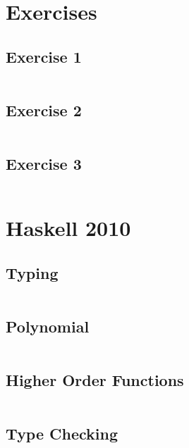 \documentclass[a4paper,9pt]{article}
\newcommand{\hsfile}[1]{\inputminted[breaklines]{haskell}{../haskell/#1.hs}}
\begin{document}
\section{Exercises}
\subsection{Exercise 1}
\hsfile{ex01/ex01}
\subsection{Exercise 2}
\hsfile{ex02/ex02}
\subsection{Exercise 3}
\hsfile{ex03/ex03}
\section{Haskell 2010}
\subsection{Typing}
\hsfile{exam2010/problem_1}
\subsection{Polynomial}
\hsfile{exam2010/problem_2}
\subsection{Higher Order Functions}
\hsfile{exam2010/problem_3}
\subsection{Type Checking}
\hsfile{exam2010/problem_4}
\end{document}
